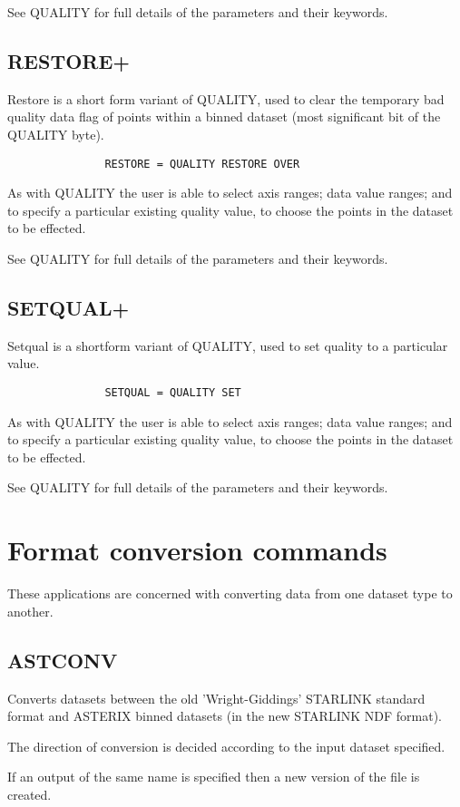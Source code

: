\documentclass{book}
\renewcommand{\_}{{\tt\char'137}}     %
\begin{document}
See QUALITY for full details of the parameters and their keywords.

\section{RESTORE+}
Restore is a short form variant of QUALITY, used to clear the
temporary bad quality data flag of points within a binned
dataset (most significant bit of the QUALITY byte).

\begin{verbatim}
               RESTORE = QUALITY RESTORE OVER
\end{verbatim}
As with QUALITY the user is able to select axis ranges; data
value ranges; and to specify a particular existing quality value,
to choose the points in the dataset to be effected.

See QUALITY for full details of the parameters and their keywords.

\section{SETQUAL+}
Setqual is a shortform variant of QUALITY, used to set
quality to a particular value.
\begin{verbatim}
               SETQUAL = QUALITY SET
\end{verbatim}
As with QUALITY the user is able to select axis ranges; data
value ranges; and to specify a particular existing quality value,
to choose the points in the dataset to be effected.

See QUALITY for full details of the parameters and their keywords.

\chapter{Format conversion commands}
These applications are concerned with converting data from one
dataset type to another.

\section{ASTCONV}
Converts datasets between the old 'Wright-Giddings' STARLINK
standard format and ASTERIX binned datasets (in the new
STARLINK NDF format).

The direction of conversion is decided according to the input
dataset specified.

If an output of the same name is specified then a new version
of the file is created.
\end{document}
